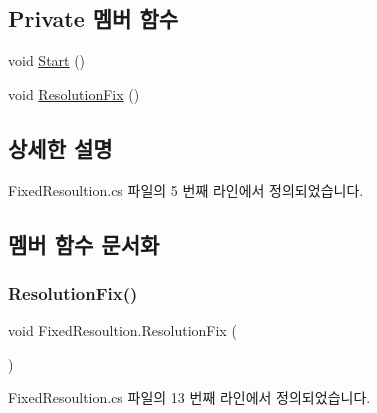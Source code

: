 \subsection*{Private 멤버 함수}
\begin{DoxyCompactItemize}
\item 
void \mbox{\hyperlink{class_fixed_resoultion_aa0b35345a2890692b24ae1e690d59437}{Start}} ()
\item 
void \mbox{\hyperlink{class_fixed_resoultion_a501f4b3d53c3ec6746495019a4e0500a}{Resolution\+Fix}} ()
\end{DoxyCompactItemize}


\subsection{상세한 설명}


Fixed\+Resoultion.\+cs 파일의 5 번째 라인에서 정의되었습니다.



\subsection{멤버 함수 문서화}
\mbox{\label{class_fixed_resoultion_a501f4b3d53c3ec6746495019a4e0500a}} 
\subsubsection{\texorpdfstring{ResolutionFix()}{ResolutionFix()}}
{\footnotesize\ttfamily void Fixed\+Resoultion.\+Resolution\+Fix (\begin{DoxyParamCaption}{ }\end{DoxyParamCaption})\hspace{0.3cm}{\ttfamily [private]}}



Fixed\+Resoultion.\+cs 파일의 13 번째 라인에서 정의되었습니다.


